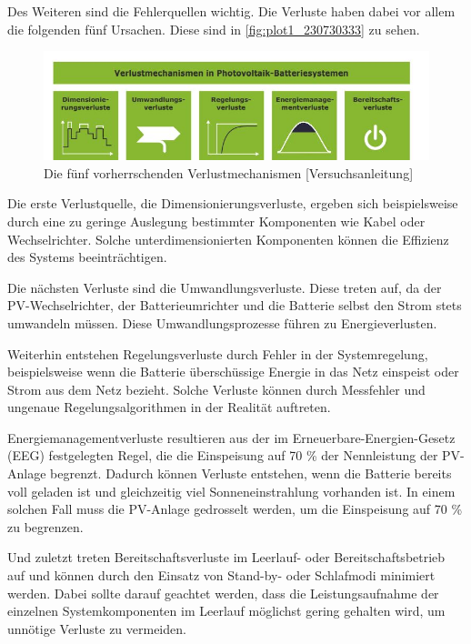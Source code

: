 Des Weiteren sind die Fehlerquellen wichtig. Die Verluste haben dabei vor allem die folgenden fünf  Ursachen. Diese sind in \autoref{fig:plot1_230730333} zu sehen.

\begin{figure}[H]
    \centering
    \includegraphics[width=\textwidth]{Abbildungen/aaa.jpg}
    \caption{Die fünf vorherrschenden Verlustmechanismen [Versuchsanleitung]}
    \label{fig:plot1_230730333}
\end{figure}
Die erste Verlustquelle, die Dimensionierungsverluste, ergeben sich beispielsweise durch eine zu geringe Auslegung bestimmter Komponenten wie Kabel oder Wechselrichter. Solche unterdimensionierten Komponenten können die Effizienz des Systems beeinträchtigen.

Die nächsten Verluste sind die Umwandlungsverluste. Diese treten auf, da der PV-Wechselrichter, der Batterieumrichter und die Batterie selbst den Strom stets umwandeln müssen. Diese Umwandlungsprozesse führen zu Energieverlusten.

Weiterhin entstehen Regelungsverluste durch Fehler in der Systemregelung, beispielsweise wenn die Batterie überschüssige Energie in das Netz einspeist oder Strom aus dem Netz bezieht. Solche Verluste können durch Messfehler und ungenaue Regelungsalgorithmen in der Realität auftreten.

Energiemanagementverluste resultieren aus der im Erneuerbare-Energien-Gesetz (EEG) festgelegten Regel, die die Einspeisung auf 70 \% der Nennleistung der PV-Anlage begrenzt. Dadurch können Verluste entstehen, wenn die Batterie bereits voll geladen ist und gleichzeitig viel Sonneneinstrahlung vorhanden ist. In einem solchen Fall muss die PV-Anlage gedrosselt werden, um die Einspeisung auf 70 \% zu begrenzen.

Und zuletzt treten Bereitschaftsverluste im Leerlauf- oder Bereitschaftsbetrieb auf und können durch den Einsatz von Stand-by- oder Schlafmodi minimiert werden. Dabei sollte darauf geachtet werden, dass die Leistungsaufnahme der einzelnen Systemkomponenten im Leerlauf möglichst gering gehalten wird, um unnötige Verluste zu vermeiden.  
